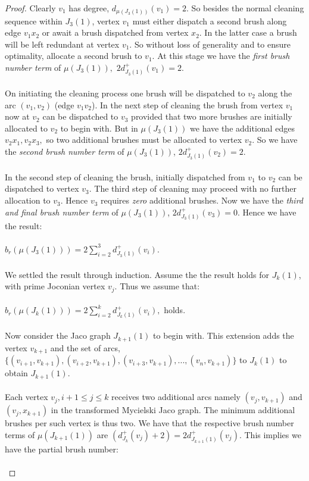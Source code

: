 \documentclass[11pt]{article}
\numberwithin{equation}{section}
\begin{document}
{\begin{proof}
Clearly $v_1$ has degree, $d_{\mu(J_3(1))}(v_1) =2.$ So besides the normal cleaning sequence within $J_3(1)$, vertex $v_1$ must either dispatch a second brush along edge $v_1x_2$ or await a brush dispatched from vertex $x_2$. In the latter case a brush will be left redundant at vertex $v_1$. So without loss of generality and to ensure optimality, allocate a second brush to $v_1$. At this stage we have the \emph{first brush number term} of $\mu(J_3(1)),$ $2d^+_{J_3(1)}(v_1) = 2.$\\ \\
On initiating the cleaning process one brush will be dispatched to $v_2$ along the arc $(v_1, v_2)$ (edge $v_1v_2$). In the next step of cleaning the brush from vertex $v_1$ now at $v_2$ can be dispatched to $v_3$ provided that two more brushes are initially allocated to $v_2$ to begin with. But in $\mu(J_3(1))$ we have the additional edges $v_2x_1, v_2x_3,$ so two additional brushes must be allocated to vertex $v_2$. So we have the \emph{second brush number term} of $\mu(J_3(1))$, $2d^+_{J_3(1)}(v_2) = 2.$\\ \\
In the second step of cleaning the brush, initially dispatched from $v_1$ to $v_2$ can be dispatched to vertex $v_3$. The third step of cleaning may proceed with no further allocation to $v_3$. Hence $v_3$ requires \emph{zero} additional brushes. Now we have the \emph{third and final brush number term} of $\mu(J_3(1))$, $2d^+_{J_3(1)}(v_3) = 0.$ Hence we have the result:\\ \\
$b_r(\mu(J_3(1))) = 2\sum\limits_{i=2}^{3}d^+_{J_3(1)}(v_i).$\\ \\
We settled the result through induction. Assume the the result holds for $J_k(1)$, with prime Joconian vertex $v_j$. Thus we assume that:\\ \\
$b_r(\mu(J_k(1))) = 2\sum\limits_{i=2}^{k}d^+_{J_k(1)}(v_i),$ holds.\\ \\
Now consider the Jaco graph $J_{k+1}(1)$ to begin with. This extension adds the vertex $v_{k+1}$ and the set of arcs, $\{(v_{i+1},v_{k+1}), (v_{i+2},v_{k+1}), (v_{i+3},v_{k+1}), ..., (v_n,v_{k+1})\}$ to $J_k(1)$ to obtain $J_{k+1}(1).$\\ \\
Each vertex $v_j, i+1 \leq j \leq k$ receives two additional arcs namely $(v_j,v_{k+1})$ and $(v_j,x_{k+1})$ in the transformed Mycielski Jaco graph. The minimum additional brushes per such vertex is thus two. We have that the respective brush number terms of $\mu(J_{k+1}(1))$ are $(d^+_{J_k}(v_j) + 2) = 2d^+_{J_{k+1}(1)}(v_j).$ This implies we have the partial brush number:\\ \\

\end{proof}}
\end{document}
